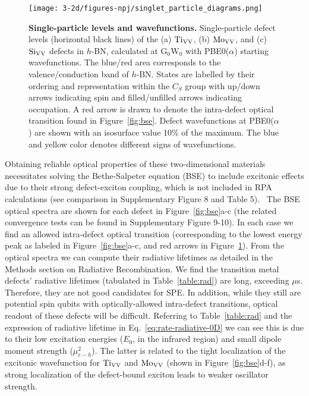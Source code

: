 \begin{figure}[H]
    \centering
    \texttt{[image: 3-2d/figures-npj/singlet\_particle\_diagrams.png]}
    \caption{
    \textbf{Single-particle levels and wavefunctions.} Single-particle defect levels (horizontal black lines) of the (a) $\text{Ti}_{\text{V}\text{V}}$, (b) $\text{Mo}_{\text{V}\text{V}}$, and (c) $\text{Si}_{\text{V}\text{V}}$ defects in $h$-BN, calculated at $\mathrm{G_0W_0}$ with PBE0($\alpha$) starting wavefunctions. The blue/red area corresponds to the valence/conduction band of $h$-BN.
    States are labelled by their ordering and representation within the $C_S$ group with up/down arrows indicating spin and filled/unfilled arrows indicating occupation.
    A red arrow is drawn to denote the intra-defect optical transition found in Figure~\ref{fig:bse}.
    Defect wavefunctions at PBE0($\alpha$) are shown with an isosurface value 10\% of the maximum. The blue and yellow color denotes different signs of wavefunctions.
}
    \label{fig:sg_ctl}
\end{figure}

Obtaining reliable optical properties of these two-dimensional materials necessitates solving the Bethe-Salpeter equation (BSE)
to include excitonic effects due to their strong defect-exciton coupling, which is not included in RPA calculations (see comparison in Supplementary Figure 8 and Table 5).~\cite{ping20132electronic,rocca2012solution,ping2012ab,ping2013}
The BSE optical spectra are shown for each defect in Figure~\ref{fig:bse}a-c (the related convergence tests can be found in Supplementary Figure 9-10).
In each case we find an allowed intra-defect optical transition (corresponding to the lowest energy peak as labeled in Figure~\ref{fig:bse}a-c, and red arrows in Figure~\ref{fig:sg_ctl}).
From the optical spectra we can compute their radiative lifetimes as detailed in the Methods section on Radiative Recombination.
We find the transition metal defects' radiative lifetimes (tabulated in Table~\ref{table:rad}) are long, exceeding $\mu$s.
Therefore, they are not good candidates for SPE. In addition, while they still are potential spin qubits with optically-allowed intra-defect transitions, optical readout of these defects will be difficult.
Referring to Table~\ref{table:rad} and the expression of radiative lifetime in Eq.~\ref{eq:rate-radiative-0D} we can see this is due to their low excitation energies ($E_0$, in the infrared region) and small dipole moment strength ($\mu^2_{e-h}$). The latter is related to the tight localization of the excitonic wavefunction for $\text{Ti}_{\text{V}\text{V}}$ and $\text{Mo}_{\text{V}\text{V}}$ (shown in Figure~\ref{fig:bse}d-f), as strong localization of the defect-bound exciton leads to weaker oscillator strength.~\cite{hours2005exciton}

